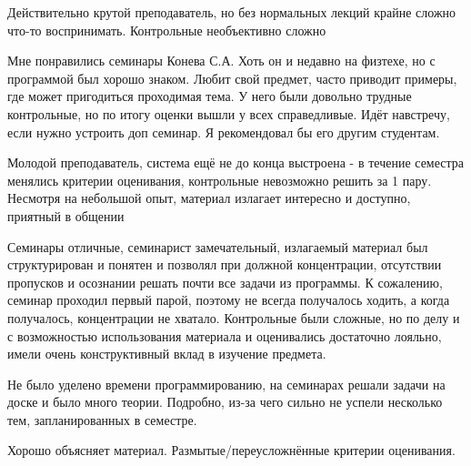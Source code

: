             \begin{commentbox} 
                Действительно крутой преподаватель, но без нормальных лекций крайне сложно что-то воспринимать. Контрольные необъективно сложно 
            \end{commentbox} 

            \begin{commentbox} 
                Мне понравились семинары Конева С.А. Хоть он и недавно на физтехе, но с программой был хорошо знаком. Любит свой предмет, часто приводит примеры, где может пригодиться проходимая тема. У него были довольно трудные контрольные, но по итогу оценки вышли у всех справедливые. Идёт навстречу, если нужно устроить доп семинар. Я рекомендовал бы его другим студентам. 
            \end{commentbox} 

            \begin{commentbox} 
                Молодой преподаватель, система ещё не до конца выстроена - в течение семестра менялись критерии оценивания, контрольные невозможно решить за 1 пару. Несмотря на небольшой опыт, материал излагает интересно и доступно, приятный в общении 
            \end{commentbox} 

            \begin{commentbox} 
                Семинары отличные, семинарист замечательный, излагаемый материал был структурирован и понятен и позволял при должной концентрации, отсутствии пропусков и осознании решать почти все задачи из программы. К сожалению, семинар проходил первый парой, поэтому не всегда получалось ходить, а когда получалось, концентрации не хватало. Контрольные были сложные, но по делу и с возможностью использования материала и оценивались достаточно лояльно, имели очень конструктивный вклад в изучение предмета. 
            \end{commentbox} 

            \begin{commentbox} 
                Не было уделено времени программированию, на семинарах решали задачи на доске и было много теории. Подробно, из-за чего сильно не успели несколько тем, запланированных в семестре. 
            \end{commentbox} 

            \begin{commentbox} 
                Хорошо объясняет материал. Размытые/переусложнённые критерии оценивания. 
            \end{commentbox} 
        

